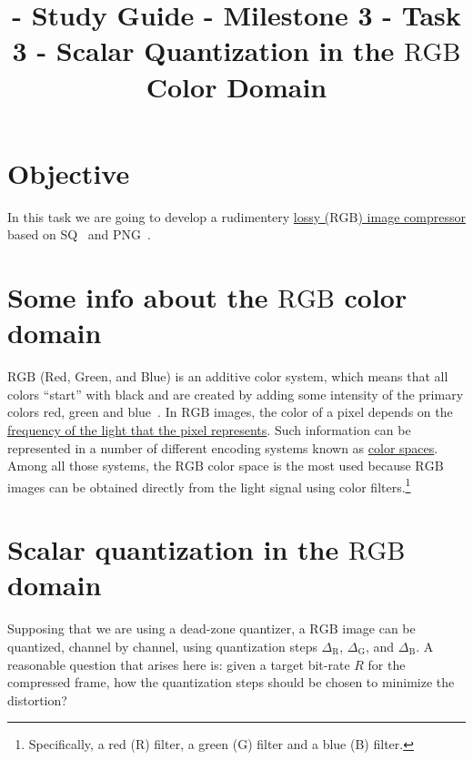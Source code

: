 

\title{\SM{} - Study Guide - Milestone 3 - Task 3 - Scalar Quantization in the $\text{RGB}$ Color Domain}

\maketitle

\tableofcontents

\section{Objective}
In this task we are going to develop a rudimentery \href{https://en.wikipedia.org/wiki/Lossy_compression}{lossy
($\text{RGB}$) image compressor} based on
SQ~\cite{vruiz__scalar_quantization} and PNG~\cite{vruiz__PNG}. 

\section{Some info about the $\text{RGB}$ color domain}

$\text{RGB}$ (Red, Green, and Blue) is an additive color system, which
means that all colors ``start'' with black and are created by adding
some intensity of the primary colors red, green and
blue~\cite{burger2016digital}. In $\text{RGB}$ images, the color of a
pixel depends on the
\href{https://en.wikipedia.org/wiki/Visible_spectrum}{frequency of the
  light that the pixel represents}. Such information can be
represented in a number of different encoding systems known as
\href{https://en.wikipedia.org/wiki/Color_space}{color spaces}. Among
all those systems, the $\text{RGB}$ color space is the most used
because $\text{RGB}$ images can be obtained directly from the light
signal using color filters.\footnote{Specifically, a red (R) filter, a
green (G) filter and a blue (B) filter.}


\section{Scalar quantization in the $\text{RGB}$ domain}

Supposing that we are using a dead-zone quantizer, a $\text{RGB}$
image can be quantized, channel by channel, using quantization steps
$\Delta_{\text{R}}$, $\Delta_{\text{G}}$, and $\Delta_{\text{B}}$. A
reasonable question that arises here is: given a target bit-rate $R$
for the compressed frame, how the quantization steps should be chosen
to minimize the distortion?

